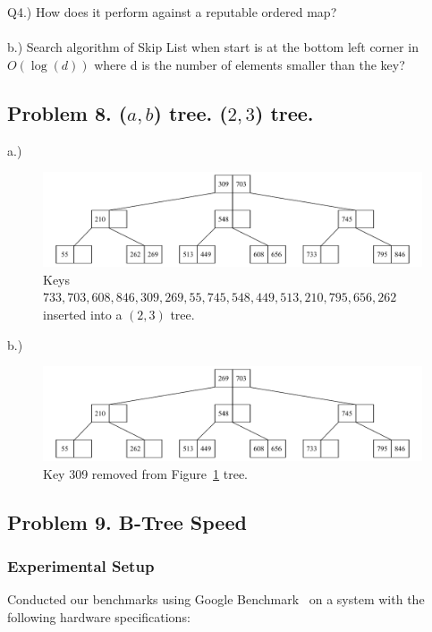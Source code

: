 \documentclass[12pt]{article}
\begin{document}
Q4.) How does it perform against a reputable ordered map?
\\\\
	
b.) Search algorithm of Skip List when start is at the bottom left corner in $O(\log(d))$ where d is the number of elements smaller than the key?
	

	
	\vspace{2in} %
	
	
	
	\subsection*{Problem 8. ($a,b$) tree. ($2, 3$) tree.}

	a.)	
	\begin{figure}[H] 
		\centering
		\includegraphics[width=0.9\linewidth]{Q8_a.drawio}
		\caption{Keys $733, 703, 608, 846, 309, 269, 55, 745, 548, 449, 513, 210, 795, 656, 262$ inserted into a $(2, 3)$ tree.}
		\label{fig:q8a}
	\end{figure}
	

	
	b.) 
	\begin{figure}[H] 
		\centering
		\includegraphics[width=0.9\linewidth]{Q8_b.drawio}
		\caption{Key 309 removed from Figure~\ref{fig:q8a} tree.}
		\label{fig:q8b}
	\end{figure}
	
	
\vspace{2in} %


\subsection*{Problem 9. B-Tree Speed}

\subsubsection*{Experimental Setup}
Conducted our benchmarks using Google Benchmark~\cite{google-bench} on a system with the following hardware specifications:
\end{document}
